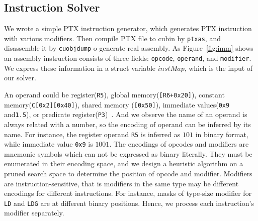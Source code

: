 \subsection{Instruction Solver}

We wrote a simple PTX instruction generator, which generates PTX instruction with various modifiers.
Then compile PTX file to cubin by {\tt ptxas}, and disassemble it by {\tt cuobjdump} o generate real assembly. 
As Figure~\ref{fig:imm} shows an assembly instruction consists of three fields: {\tt opcode}, {\tt operand}, and {\tt modifier}. We express these information in a struct
variable $instMap$, which is the input of our solver.

An operand could be register({\tt R5}), 
global memory({\tt [R6+0x20]}), constant memory({\tt C[0x2][0x40]}), shared memory ({\tt [0x50]}),
immediate values({\tt 0x9} and{\tt1.5}), or predicate register({\tt P3})~\cite{ptx2015isa}. %
And we observe the name of an operand is always related with a number, so the encoding of operand can be inferred by its name.
For instance, the register operand {\tt R5} is inferred as $101$ in binary format, while immediate value {\tt 0x9} is $1001$. 
The encodings of opcodes and modifiers are mnemonic symbols which can not be expressed as binary literally. 
They must be enumerated in their encoding space, and we design a heuristic algorithm on a pruned search space to
determine the position of opcode and modifier.
Modifiers are instruction-sensitive, that is modifiers in the same type may be different encodings for different instructions. 
For instance, masks of type-size
modifier for {\tt LD} and {\tt LDG} are at different binary positions. Hence, we process each instruction's modifier separately. 

